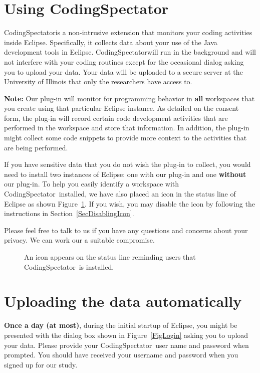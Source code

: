 \documentclass{article}
\newcommand{\fig}[1]{\imgsrc{#1.png}}%
\newcommand\fig[1]{\texttt{[image: \#1]}}%
\newcommand\codspec{CodingSpectator}
\newcommand\infonote[1]{\textbf{Note: }#1}
\begin{document}
\section{Using \codspec}
%
\codspec is a non-intrusive extension that monitors your coding activities
inside Eclipse. Specifically, it collects data about your use of the Java
development tools in Eclipse. \codspec will run in the background and will not
interfere with your coding routines except for the occasional dialog asking you
to upload your data. Your data will be uploaded to a secure server at the
University of Illinois that only the researchers have access to.

\infonote{Our plug-in will monitor for programming behavior in \textbf{all}
workspaces that you create using that particular Eclipse instance. As detailed
on the consent form, the plug-in will record certain code development activities
that are performed in the workspace and store that information. In addition, the
plug-in might collect some code snippets to provide more context to the
activities that are being performed.

If you have sensitive data that you do not wish the plug-in to collect, you
would need to install two instances of Eclipse: one with our plug-in and one
\textbf{without} our plug-in. To help you easily identify a workspace with
\codspec\ installed, we have also placed an icon in the status line of Eclipse
as shown Figure~\ref{Status}. If you wish, you may disable the icon by following
the instructions in Section~\ref{SecDisablingIcon}.

Please feel free to talk to us if you have any questions and concerns about your
privacy. We can work our a suitable compromise.}

\begin{figure}[H]
%
\centering
%
\fig{figs/status}
%
\caption{\label{Status}An icon appears on the status line reminding users that
\codspec\ is installed.}
%
\end{figure}
%
\section{Uploading the data automatically}
%
\textbf{Once a day (at most)}, during the initial startup of Eclipse, you might
be presented with the dialog box shown in Figure~\ref{FigLogin} asking you to
upload your data. Please provide your \codspec\ user name and password when
prompted. You should have received your username and password when you signed up
for our study.
\end{document}

